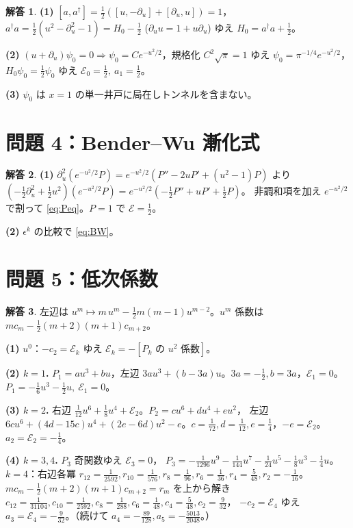 \documentclass[dvipdfmx, uplatex]{jsarticle}
\newcommand{\cE}{\mathcal{E}}
\theoremstyle{definition}
\newtheorem*{sol}{解答}
\begin{document}
\begin{sol}
\textbf{(1)} $[a,a^\dagger]=\tfrac12([u,-\partial_u]+[\partial_u,u])=1$，
$a^\dagger a=\tfrac12(u^2-\partial_u^2-1)=H_0-\tfrac12$ ($\partial_u u=1+u\partial_u$) ゆえ $H_0=a^\dagger a+\tfrac12$。

\textbf{(2)} $(u+\partial_u)\psi_0=0\Rightarrow\psi_0=Ce^{-u^2/2}$，規格化 $C^2\sqrt\pi=1$ ゆえ
$\boxed{\psi_0=\pi^{-1/4}e^{-u^2/2}}$，$H_0\psi_0=\tfrac12\psi_0$ ゆえ $\boxed{\cE_0=\tfrac12,\ a_1=\tfrac12}$。

\textbf{(3)} $\psi_0$ は $x=1$ の単一井戸に局在しトンネルを含まない。
\end{sol}

\section{問題 4：Bender--Wu 漸化式}

\begin{sol}
\textbf{(1)} $\partial_u^2(e^{-u^2/2}P)=e^{-u^2/2}(P''-2uP'+(u^2-1)P)$ より
$(-\tfrac12\partial_u^2+\tfrac12u^2)(e^{-u^2/2}P)=e^{-u^2/2}(-\tfrac12P''+uP'+\tfrac12P)$。
非調和項を加え $e^{-u^2/2}$ で割って \eqref{eq:Peq}。$P=1$ で $\cE=\tfrac12$。

\textbf{(2)} $\epsilon^k$ の比較で \eqref{eq:BW}。
\end{sol}

\section{問題 5：低次係数}

\begin{sol}
左辺は $u^m\mapsto m\,u^m-\tfrac12m(m-1)u^{m-2}$。$u^m$ 係数は $mc_m-\tfrac12(m+2)(m+1)c_{m+2}$。

\textbf{(1)} $u^0$：$-c_2=\cE_k$ ゆえ $\cE_k=-[P_k\text{ の }u^2\text{ 係数}]$。

\textbf{(2) $k=1$.} $P_1=au^3+bu$，左辺 $3au^3+(b-3a)u$。$3a=-\tfrac12,b=3a$，$\cE_1=0$。
$\boxed{P_1=-\tfrac16u^3-\tfrac12u,\ \cE_1=0}$。

\textbf{(3) $k=2$.} 右辺 $\tfrac1{12}u^6+\tfrac18u^4+\cE_2$。$P_2=cu^6+du^4+eu^2$，
左辺 $6cu^6+(4d-15c)u^4+(2e-6d)u^2-e$。$c=\tfrac1{72},d=\tfrac1{12},e=\tfrac14$，$-e=\cE_2$。
$\boxed{a_2=\cE_2=-\tfrac14}$。

\textbf{(4) $k=3,4$.} $P_3$ 奇関数ゆえ $\boxed{\cE_3=0}$，
$P_3=-\tfrac1{1296}u^9-\tfrac1{144}u^7-\tfrac1{24}u^5-\tfrac18u^3-\tfrac14u$。
$k=4$：右辺各冪 $r_{12}=\tfrac1{2592},r_{10}=\tfrac1{576},r_8=\tfrac1{96},r_6=\tfrac1{36},r_4=\tfrac5{48},r_2=-\tfrac1{16}$。
$mc_m-\tfrac12(m+2)(m+1)c_{m+2}=r_m$ を上から解き
$c_{12}=\tfrac1{31104},c_{10}=\tfrac1{2592},c_8=\tfrac1{288},c_6=\tfrac1{48},c_4=\tfrac5{48},c_2=\tfrac9{32}$，
$-c_2=\cE_4$ ゆえ $\boxed{a_3=\cE_4=-\tfrac9{32}}$。（続けて $a_4=-\tfrac{89}{128},a_5=-\tfrac{5013}{2048}$。）
\end{sol}
\end{document}
